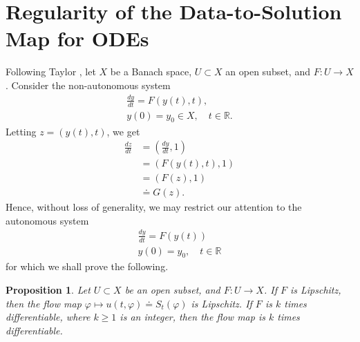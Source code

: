 \documentclass[12pt,reqno]{amsart}
\numberwithin{equation}{section}  %
\newcommand{\rr}{\mathbb{R}}
\newcommand{\vp}{\varphi}
\newtheorem{proposition}[theorem]{Proposition}
\begin{document}
\section{Regularity of the Data-to-Solution Map for ODEs} 
\label{sec:dep-param-smooth}
%
%
Following Taylor \cite{Taylor:1995kx}, let $X$ be a Banach space, $U \subset X$ an open subset, and $F: U \to X$. Consider the non-autonomous system
%
%
\begin{gather}
  \label{aa-sm}
\frac{dy}{dt} = F(y(t), t),
\\
y(0)= y_{0} \in X, \quad t \in \rr.
\label{bb-sm}
\end{gather}
%
Letting $z = (y(t), t)$, we get
%
%
\begin{equation*}
\begin{split}
\frac{dz}{dt}  
& = \left (\frac{dy}{dt}, 1 \right )
\\
& = \left( F(y(t), t), 1 \right)
\\
& = \left( F(z), 1 \right)
\\
& \doteq G(z).
\end{split}
\end{equation*}
%
%
Hence, without loss of generality, we may restrict our attention to the
autonomous system
%
%
\begin{gather}
\frac{dy}{dt} = F\left( y(t) \right)
\label{ode-eq-sm}
\\
y(0) = y_{0}, \quad t \in \rr
\label{ode-init-data-sm}
\end{gather}
%
%
%
for which we shall prove the following.
%
%
%
%
%
%
%
%
\begin{proposition}
  Let $U \subset X$ be an open subset, and $F: U  \to X$.
  If $F$ is Lipschitz, then the flow map $\vp \mapsto u(t, \vp) \doteq
  S_{t}(\vp)$ is Lipschitz. If $F$ is $k$ times differentiable, where $k \ge 1$
  is an integer, then the flow map is $k$ times differentiable.
  \label{prop:reg-result}
\end{proposition}
%
%
%
%
\end{document}
